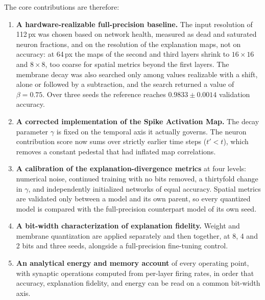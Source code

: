 The core contributions are therefore:

\begin{enumerate}
  \item \textbf{A hardware-realizable full-precision baseline.} The input resolution
        of 112\,px was chosen based on network health,
        measured as dead and saturated neuron
        fractions, and on the resolution of the explanation maps, not on
        accuracy: at 64\,px the maps of the second and third layers shrink to
        $16\times16$ and $8\times8$, too coarse for spatial metrics beyond the
        first layers. The membrane decay was also searched only among
        values realizable with a shift, alone or followed by a subtraction, and the search
        returned a value of $\beta = 0.75$. Over three seeds the reference reaches
        $0.9833 \pm 0.0014$ validation accuracy.

  \item \textbf{A corrected implementation of the Spike Activation Map.}
        The decay parameter $\gamma$ is fixed on the
        temporal axis it actually governs. The neuron contribution score now
        sums over strictly earlier time steps ($t' < t$), which removes a
        constant pedestal that had inflated map correlations.

  \item \textbf{A calibration of the explanation-divergence metrics} at four
        levels: numerical noise, continued training with no bits removed, a
        thirtyfold change in $\gamma$, and independently initialized networks of
        equal accuracy. Spatial metrics are validated only between a model and
        its own parent, so every quantized model is compared with the
        full-precision counterpart model of its own seed.

  \item \textbf{A bit-width characterization of explanation fidelity.} Weight and membrane quantization are applied
        separately and then together, at 8, 4 and 2 bits and three seeds,
        alongside a full-precision fine-tuning control.

  \item \textbf{An analytical energy and memory account} of every operating
        point, with synaptic operations computed from per-layer firing rates,
        in order that accuracy, explanation fidelity, and energy can be read on a
        common bit-width axis.
\end{enumerate}

